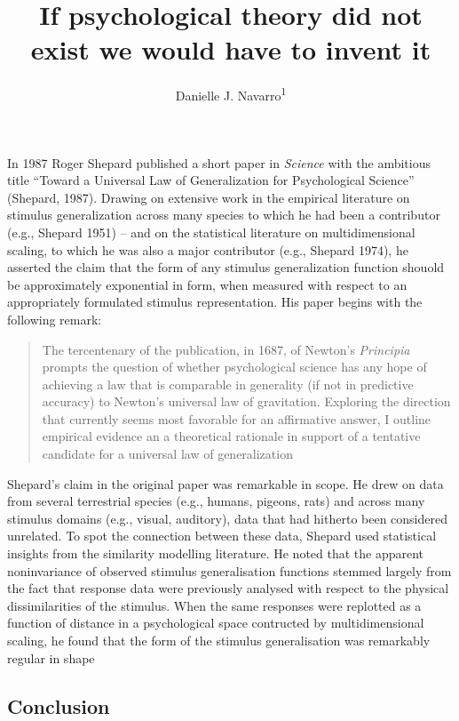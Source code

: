 \documentclass[jnl]{apa6}
\affiliation{
\vspace{0.5cm}
\textsuperscript{1} School of Psychology, University of New South Wales}
\title{If psychological theory did not exist we would have to invent it}
\author{Danielle J. Navarro\textsuperscript{1}}
\date{}
\begin{document}
\maketitle

In 1987 Roger Shepard published a short paper in \emph{Science} with the ambitious title \enquote{Toward a Universal Law of Generalization for Psychological Science} (Shepard, 1987). Drawing on extensive work in the empirical literature on stimulus generalization across many species to which he had been a contributor (e.g., Shepard 1951) -- and on the statistical literature on multidimensional scaling, to which he was also a major contributor (e.g., Shepard 1974), he asserted the claim that the form of any stimulus generalization function shouold be approximately exponential in form, when measured with respect to an appropriately formulated stimulus representation. His paper begins with the following remark:

\begin{quote}
The tercentenary of the publication, in 1687, of Newton's \emph{Principia} prompts the question of whether psychological science has any hope of achieving a law that is comparable in generality (if not in predictive accuracy) to Newton's universal law of gravitation. Exploring the direction that currently seems most favorable for an affirmative answer, I outline empirical evidence an a theoretical rationale in support of a tentative candidate for a universal law of generalization
\end{quote}

Shepard's claim in the original paper was remarkable in scope. He drew on data from several terrestrial species (e.g., humans, pigeons, rats) and across many stimulus domains (e.g., visual, auditory), data that had hitherto been considered unrelated. To spot the connection between these data, Shepard used statistical insights from the similarity modelling literature. He noted that the apparent noninvariance of observed stimulus generalisation functions stemmed largely from the fact that response data were previously analysed with respect to the physical dissimilarities of the stimulus. When the same responses were replotted as a function of distance in a psychological space contructed by multidimensional scaling, he found that the form of the stimulus generalisation was remarkably regular in shape

\hypertarget{conclusion}{%
\subsection{Conclusion}\label{conclusion}}
\end{document}
